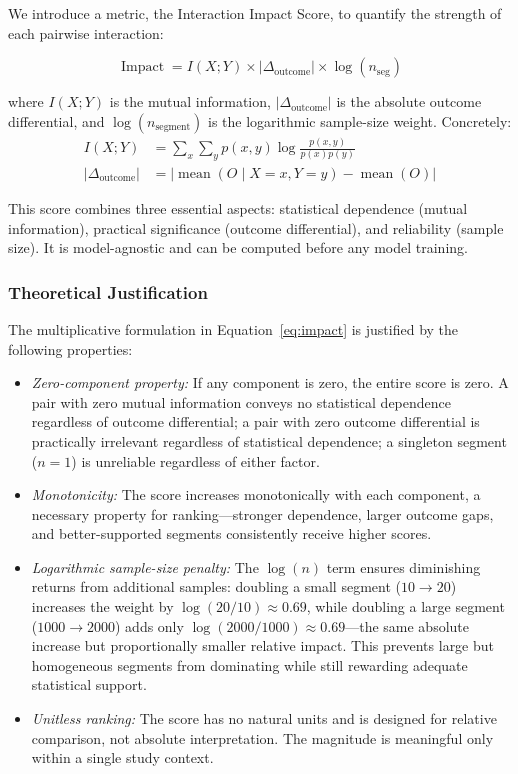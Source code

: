 \documentclass[conference]{IEEEtran}
\begin{document}
We introduce a metric, the Interaction Impact Score, to quantify the strength of each pairwise interaction:

\begin{equation}
\operatorname{Impact}= I(X;Y) \times |\Delta_{\text{outcome}}| \times \log(n_{\text{seg}})
\label{eq:impact}
\end{equation}

where $I(X;Y)$ is the mutual information, $|\Delta_{\text{outcome}}|$ is the absolute outcome differential, and $\log(n_{\text{segment}})$ is the logarithmic sample-size weight. Concretely:
\[
\begin{aligned}
I(X;Y) &= \sum_x \sum_y p(x,y) \log\frac{p(x,y)}{p(x)p(y)} \\
|\Delta_{\text{outcome}}| &= |\operatorname{mean}(O \mid X=x, Y=y) - \operatorname{mean}(O)|
\end{aligned}
\]

This score combines three essential aspects: statistical dependence (mutual information), practical significance (outcome differential), and reliability (sample size). It is model-agnostic and can be computed before any model training.

\subsubsection{Theoretical Justification}

The multiplicative formulation in Equation~\ref{eq:impact} is justified by the following properties:

\begin{itemize}
    \item \textit{Zero-component property:} If any component is zero, the entire score is zero. A pair with zero mutual information conveys no statistical dependence regardless of outcome differential; a pair with zero outcome differential is practically irrelevant regardless of statistical dependence; a singleton segment ($n=1$) is unreliable regardless of either factor.
    \item \textit{Monotonicity:} The score increases monotonically with each component, a necessary property for ranking---stronger dependence, larger outcome gaps, and better-supported segments consistently receive higher scores.
    \item \textit{Logarithmic sample-size penalty:} The $\log(n)$ term ensures diminishing returns from additional samples: doubling a small segment ($10\to20$) increases the weight by $\log(20/10) \approx 0.69$, while doubling a large segment ($1000\to2000$) adds only $\log(2000/1000) \approx 0.69$---the same absolute increase but proportionally smaller relative impact. This prevents large but homogeneous segments from dominating while still rewarding adequate statistical support.
    \item \textit{Unitless ranking:} The score has no natural units and is designed for relative comparison, not absolute interpretation. The magnitude is meaningful only within a single study context.
\end{itemize}
\end{document}
